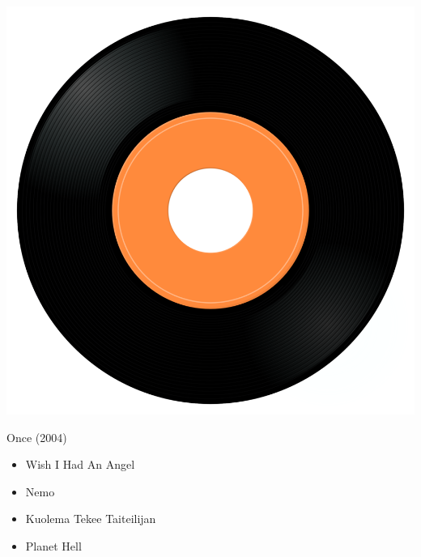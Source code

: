 \begin{minipage}[t]{0.25\textwidth}
\captionsetup{type=figure}
\includegraphics[width=\textwidth]{Images/cover.png}
\caption*{Once (2004)}
\end{minipage}
\begin{minipage}[t]{0.25\textwidth}\vspace{0pt}
\begin{itemize}[nosep,leftmargin=1em,labelwidth=*,align=left]
	\setlength{\itemsep}{0pt}
	\item Wish I Had An Angel
	\item Nemo
	\item Kuolema Tekee Taiteilijan
	\item Planet Hell
\end{itemize}
\end{minipage}
